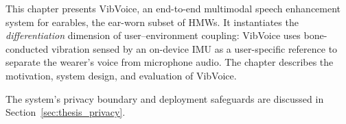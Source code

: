 This chapter presents VibVoice, an end-to-end multimodal speech enhancement system for earables, the ear-worn subset of HMWs. It instantiates the \textit{differentiation} dimension of user--environment coupling: VibVoice uses bone-conducted vibration sensed by an on-device IMU as a user-specific reference to separate the wearer's voice from microphone audio. The chapter describes the motivation, system design, and evaluation of VibVoice.


% 




The system's privacy boundary and deployment safeguards are discussed in Section~\ref{sec:thesis_privacy}.
